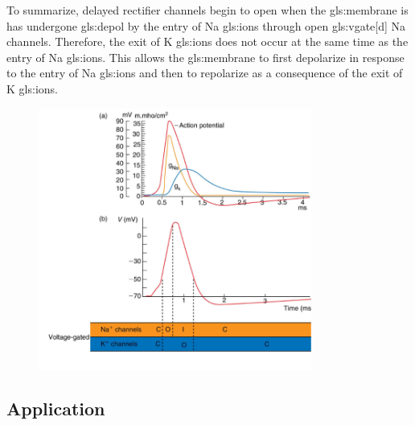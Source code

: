 \documentclass[class={myRUCProject}, crop=false]{standalone}
\begin{document}
To summarize, %
delayed rectifier channels begin to open when the \gls{gls:membrane} is has undergone \gls{gls:depol} by the entry of \gls{Na} \glspl{gls:ion} through open \gls{gls:vgate}[d] \gls{Na} channels. 
Therefore, the exit of \gls{K} \glspl{gls:ion} does not occur at the same time as the entry of \gls{Na} \glspl{gls:ion}. This allows the \gls{gls:membrane} to first depolarize in response to the entry of \gls{Na} \glspl{gls:ion} and then to repolarize as a consequence of the exit of \gls{K} \glspl{gls:ion}.
\begin{figure}[H]
    \centering
    \includegraphics[width=0.8\textwidth]{Pictures//Anakin/N.K.png}
    \caption{}\label{fig:Knumber}
\end{figure}



\subsection{Application} 
\end{document}
